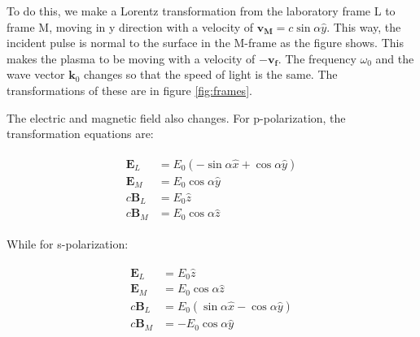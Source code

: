 \documentclass[12pt]{article}
\begin{document}
To do this, we make a Lorentz transformation from the laboratory frame L to frame M, moving in y direction with a velocity of $\mathbf{v_M} = c\sin\alpha \hat{y}$. This way, the incident pulse is normal to the surface in the M-frame as the figure shows. This makes the plasma to be moving with a velocity of $-\mathbf{v_f}$. The frequency $\omega_0$ and the wave vector $\mathbf{k}_0$ changes so that the speed of light is the same. The transformations of these are in figure \ref{fig:frames}.

The electric and magnetic field also changes. For p-polarization, the transformation equations are:

\begin{align}
    \label{eq:field-p}
    \begin{split}
        \mathbf{E}_L  & = E_0(-\sin\alpha \hat{x} + \cos\alpha \hat{y}) \\
        \mathbf{E}_M  & = E_0\cos\alpha \hat{y}                         \\
        c\mathbf{B}_L & = E_0\hat{z}                                    \\
        c\mathbf{B}_M & = E_0\cos\alpha \hat{z}
    \end{split}
\end{align}

While for s-polarization:

\begin{align}
    \label{eq:field-s}
    \begin{split}
        \mathbf{E}_L & = E_0\hat{z}                                    \\
        \mathbf{E}_M & = E_0\cos\alpha \hat{z}                        \\
        c\mathbf{B}_L & = E_0(\sin\alpha \hat{x} - \cos\alpha \hat{y}) \\
        c\mathbf{B}_M & = -E_0\cos\alpha \hat{y}
    \end{split}
\end{align}
\end{document}
